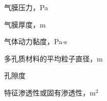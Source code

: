 %
%
%

\begin{symbols}
\item[$p$]              气膜压力，Pa
\item[$h$]              气膜厚度，m
\item[$\eta$]           气体动力黏度，Pa$\cdot$s
\item[$D_{\mathrm{p}}$] 多孔质材料的平均粒子直径，m
\item[$\psi$]           孔隙度
\item[$C_2$]            特征渗透性或固有渗透性，m$^2$
\end{symbols}
